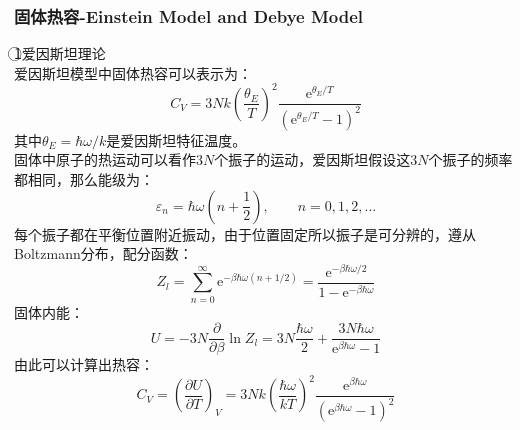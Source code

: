 \documentclass[12pt]{article}
\begin{document}
\subsubsection{固体热容-Einstein Model and Debye Model}
\noindent
\textcircled{1}爱因斯坦理论\\
爱因斯坦模型中固体热容可以表示为：
\begin{equation}
	C_V=3Nk(\frac{\theta_E}{T})^2\frac{\mathrm{e}^{\theta_E/T}}{(\mathrm{e}^{\theta_E/T}-1)^2}
\end{equation}
其中$\theta_E=\hbar\omega/k$是爱因斯坦特征温度。\\
固体中原子的热运动可以看作$3N$个振子的运动，爱因斯坦假设这$3N$个振子的频率都相同，那么能级为：
\begin{equation}
	\varepsilon_n=\hbar \omega(n+\frac{1}{2}),\quad\quad n=0,1,2,...
\end{equation}
每个振子都在平衡位置附近振动，由于位置固定所以振子是可分辨的，遵从Boltzmann分布，配分函数：
\begin{equation}
	Z_l=\sum_{n=0}^{\infty}\mathrm{e}^{-\beta\hbar\omega(n+1/2)}=\frac{\mathrm{e}^{-\beta\hbar\omega/2}}{1-\mathrm{e}^{-\beta\hbar\omega}} 
\end{equation}
固体内能：
\begin{equation}
	U=-3N\frac{\partial}{\partial \beta}\ln Z_l=3N\frac{\hbar \omega}{2}+\frac{3N\hbar\omega}{\mathrm{e}^{\beta\hbar \omega}-1}
\end{equation}
由此可以计算出热容：
\begin{equation}
	C_V=(\frac{\partial U}{\partial T})_V=3Nk(\frac{\hbar\omega}{kT})^2\frac{\mathrm{e}^{\beta\hbar\omega}}{(\mathrm{e}^{\beta\hbar\omega}-1)^2}
\end{equation}
\end{document}
